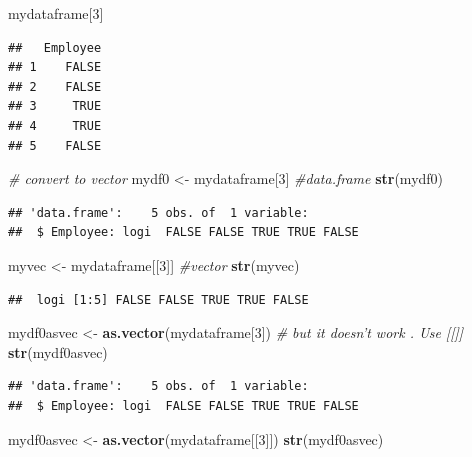 \documentclass[]{book}
\newenvironment{Shaded}{\begin{snugshade}}{\end{snugshade}}
\newcommand{\KeywordTok}[1]{\textcolor[rgb]{0.13,0.29,0.53}{\textbf{{#1}}}}
\newcommand{\DecValTok}[1]{\textcolor[rgb]{0.00,0.00,0.81}{{#1}}}
\newcommand{\StringTok}[1]{\textcolor[rgb]{0.31,0.60,0.02}{{#1}}}
\newcommand{\CommentTok}[1]{\textcolor[rgb]{0.56,0.35,0.01}{\textit{{#1}}}}
\newcommand{\NormalTok}[1]{{#1}}
\begin{document}
\begin{Shaded}
\begin{Highlighting}[]
\NormalTok{mydataframe[}\DecValTok{3}\NormalTok{]}
\end{Highlighting}
\end{Shaded}

\begin{verbatim}
##   Employee
## 1    FALSE
## 2    FALSE
## 3     TRUE
## 4     TRUE
## 5    FALSE
\end{verbatim}

\begin{Shaded}
\begin{Highlighting}[]
\CommentTok{# convert to vector}
\NormalTok{mydf0 <-}\StringTok{ }\NormalTok{mydataframe[}\DecValTok{3}\NormalTok{] }\CommentTok{#data.frame}
\KeywordTok{str}\NormalTok{(mydf0)}
\end{Highlighting}
\end{Shaded}

\begin{verbatim}
## 'data.frame':    5 obs. of  1 variable:
##  $ Employee: logi  FALSE FALSE TRUE TRUE FALSE
\end{verbatim}

\begin{Shaded}
\begin{Highlighting}[]
\NormalTok{myvec <-}\StringTok{ }\NormalTok{mydataframe[[}\DecValTok{3}\NormalTok{]]  }\CommentTok{#vector}
\KeywordTok{str}\NormalTok{(myvec)}
\end{Highlighting}
\end{Shaded}

\begin{verbatim}
##  logi [1:5] FALSE FALSE TRUE TRUE FALSE
\end{verbatim}

\begin{Shaded}
\begin{Highlighting}[]
\NormalTok{mydf0asvec <-}\StringTok{ }\KeywordTok{as.vector}\NormalTok{(mydataframe[}\DecValTok{3}\NormalTok{]) }\CommentTok{# but it doesn't work . Use [[]]}
\KeywordTok{str}\NormalTok{(mydf0asvec)}
\end{Highlighting}
\end{Shaded}

\begin{verbatim}
## 'data.frame':    5 obs. of  1 variable:
##  $ Employee: logi  FALSE FALSE TRUE TRUE FALSE
\end{verbatim}

\begin{Shaded}
\begin{Highlighting}[]
\NormalTok{mydf0asvec <-}\StringTok{ }\KeywordTok{as.vector}\NormalTok{(mydataframe[[}\DecValTok{3}\NormalTok{]])}
\KeywordTok{str}\NormalTok{(mydf0asvec)}
\end{Highlighting}
\end{Shaded}
\end{document}
